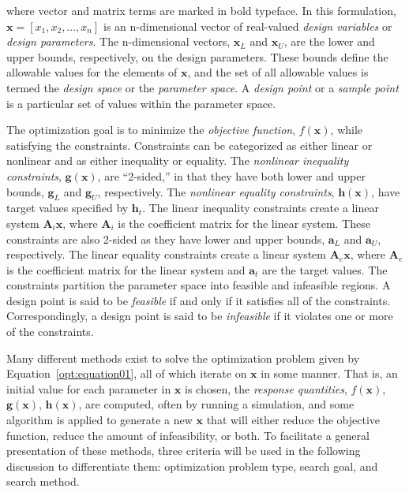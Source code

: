 where vector and matrix terms are marked in bold typeface. In this
formulation, $\mathbf{x}=[x_{1},x_{2},\ldots,x_{n}]$ is an
n-dimensional vector of real-valued \emph{design variables} or
\emph{design parameters}. The n-dimensional vectors, $\mathbf{x}_{L}$
and $\mathbf{x}_U$, are the lower and upper bounds, respectively, on
the design parameters. These bounds define the allowable values for
the elements of $\mathbf{x}$, and the set of all allowable values is
termed the \emph{design space} or the \emph{parameter space}. A
\emph{design point} or a \emph{sample point} is a particular set of 
values within the parameter space.

The optimization goal is to minimize the \emph{objective function},
$f(\mathbf{x})$, while satisfying the constraints.  Constraints can be
categorized as either linear or nonlinear and as either inequality or
equality. The \emph{nonlinear inequality constraints},
$\mathbf{g(x)}$, are ``2-sided,'' in that they have both lower and
upper bounds, $\mathbf{g}_L$ and $\mathbf{g}_U$, respectively. The
\emph{nonlinear equality constraints}, $\mathbf{h(x)}$, have target
values specified by $\mathbf{h}_{t}$.  The linear inequality
constraints create a linear system $\mathbf{A}_i\mathbf{x}$, where
$\mathbf{A}_i$ is the coefficient matrix for the linear system.  These
constraints are also 2-sided as they have lower and upper bounds,
$\mathbf{a}_L$ and $\mathbf{a}_U$, respectively. The linear equality
constraints create a linear system $\mathbf{A}_e\mathbf{x}$, where
$\mathbf{A}_e$ is the coefficient matrix for the linear system and
$\mathbf{a}_{t}$ are the target values.  The constraints partition the
parameter space into feasible and infeasible regions. A design point
is said to be \emph{feasible} if and only if it satisfies all of the
constraints. Correspondingly, a design point is said to be
\emph{infeasible} if it violates one or more of the constraints.

Many different methods exist to solve the optimization problem given
by Equation~\ref{opt:equation01}, all of which iterate on
$\mathbf{x}$ in some manner.  That is, an initial value for each
parameter in $\mathbf{x}$ is chosen, the \emph{response quantities},
$f(\mathbf{x})$, $\mathbf{g(x)}$, $\mathbf{h(x)}$, are computed, often
by running a simulation, and some algorithm is applied to generate a
new $\mathbf{x}$ that will either reduce the objective function,
reduce the amount of infeasibility, or both.  To facilitate a general
presentation of these methods, three criteria will be used in the
following discussion to differentiate them: optimization problem type,
search goal, and search method.

